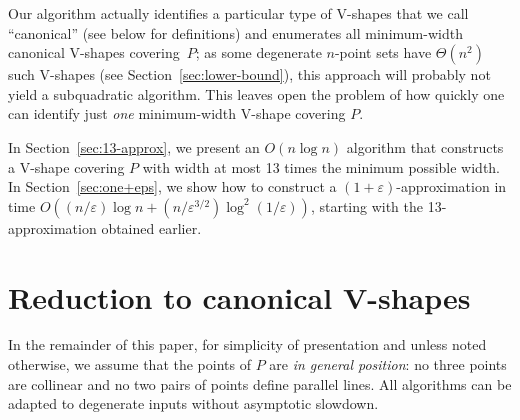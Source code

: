 \documentclass{llncs}
\let\eps\varepsilon
\begin{document}
Our algorithm actually identifies a particular type of V-shapes that
we call ``canonical'' (see below for definitions) and enumerates all
minimum-width canonical V-shapes covering~$P$; as some degenerate
$n$-point sets have $\Theta(n^2)$ such V-shapes (see Section~\ref{sec:lower-bound}), this approach will probably not yield
a subquadratic algorithm.  This leaves open the problem of how quickly
one can identify just \emph{one} minimum-width V-shape covering $P$.

In Section~\ref{sec:13-approx}, we present an $O(n \log n)$ algorithm
that constructs a V-shape covering $P$ with width at most 13 times the
minimum possible width.  In Section~\ref{sec:one+eps}, we show how to
construct a $(1+\eps)$-approximation in time $O((n/\eps)\log n +
(n/\eps^{3/2})\log^2(1/\eps))$, starting with the 13-approximation
obtained earlier.

\section{Reduction to canonical V-shapes}
\label{sec:canonical}

In the remainder of this paper, for simplicity of presentation and 
unless noted otherwise, we assume
that the points of $P$ are \emph{in general position}: no three points are
collinear and no two pairs of points define parallel lines. 
All algorithms can be adapted to degenerate inputs without asymptotic slowdown.
\end{document}
